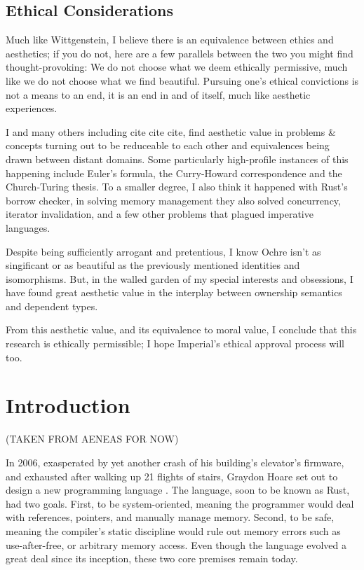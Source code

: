 \documentclass[12pt,twoside]{report}
\begin{document}
\newpage
\section*{Ethical Considerations}
Much like Wittgenstein, I believe there is an equivalence between ethics and aesthetics; if you do not, here are a few parallels between the two you might find thought-provoking: We do not choose what we deem ethically permissive, much like we do not choose what we find beautiful. Pursuing one's ethical convictions is not a means to an end, it is an end in and of itself, much like aesthetic experiences.

I and many others including cite cite cite, find aesthetic value in problems \& concepts turning out to be reduceable to each other and equivalences being drawn between distant domains. Some particularly high-profile instances of this happening include Euler's formula, the Curry-Howard correspondence and the Church-Turing thesis. To a smaller degree, I also think it happened with Rust's borrow checker, in solving memory management they also solved concurrency, iterator invalidation, and a few other problems that plagued imperative languages.

Despite being sufficiently arrogant and pretentious, I know Ochre isn't as singificant or as beautiful as the previously mentioned identities and isomorphisms. But, in the walled garden of my special interests and obsessions, I have found great aesthetic value in the interplay between ownership semantics and dependent types.

From this aesthetic value, and its equivalence to moral value, I conclude that this research is ethically permissible; I hope Imperial's ethical approval process will too.

\clearpage{\pagestyle{empty}\cleardoublepage}

\tableofcontents 


\setcounter{page}{1}
\fancyhead[LE,RO]{\slshape \rightmark}
\fancyhead[LO,RE]{\slshape \leftmark}

\chapter{Introduction}
(TAKEN FROM AENEAS FOR NOW)

In 2006, exasperated by yet another crash of his building's elevator's firmware, and exhausted after walking up 21 flights of stairs, Graydon Hoare set out to design a new programming language \citep{rust-anecdote}. The language, soon to be known as Rust, had two goals. First, to be system-oriented, meaning the programmer would deal with references, pointers, and manually manage memory. Second, to be safe, meaning the compiler's static discipline would rule out memory errors such as use-after-free, or arbitrary memory access. Even though the language evolved a great deal since its inception, these two core premises remain today. 
\end{document}
